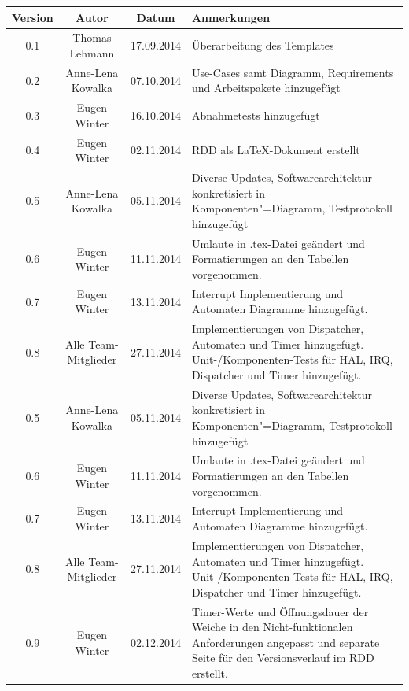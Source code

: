 \documentclass[oneside,a4paper,titlepage]{scrartcl}              %
\begin{document}
\begin{small}
  \begin{center}
    \begin{tabular}{|c|c|c|p{7.25cm}|}
      \hline
      \rowcolor{lightgray}\textbf{Version} & \textbf{Autor} & \textbf{Datum} & \textbf{Anmerkungen}\\
      \hline
      0.1 & Thomas Lehmann & 17.09.2014 & Überarbeitung des Templates\\
      \hline
      0.2 & Anne-Lena Kowalka & 07.10.2014 & Use-Cases samt Diagramm, Requirements und Arbeitspakete hinzugefügt\\
      \hline
      0.3 & Eugen Winter & 16.10.2014 & Abnahmetests hinzugefügt\\
      \hline
      0.4 & Eugen Winter & 02.11.2014 & RDD als \LaTeX -Dokument erstellt\\
      \hline
      0.5 & Anne-Lena Kowalka & 05.11.2014 & Diverse Updates, Softwarearchitektur konkretisiert in Komponenten"=Diagramm, Testprotokoll hinzugefügt \\
      \hline
      0.6 & Eugen Winter & 11.11.2014 & Umlaute in .tex-Datei geändert und Formatierungen an den Tabellen vorgenommen.\\
      \hline
      0.7 & Eugen Winter & 13.11.2014 & Interrupt Implementierung und Automaten Diagramme hinzugefügt.\\
      \hline
      0.8 & Alle Team-Mitglieder & 27.11.2014 & Implementierungen von Dispatcher, Automaten und Timer hinzugefügt. Unit-/Komponenten-Tests für HAL, IRQ, Dispatcher und Timer hinzugefügt.\\
      \hline
      0.5 & Anne-Lena Kowalka & 05.11.2014 & Diverse Updates, Softwarearchitektur konkretisiert in Komponenten"=Diagramm, Testprotokoll hinzugefügt \\
      \hline
      0.6 & Eugen Winter & 11.11.2014 & Umlaute in .tex-Datei geändert und Formatierungen an den Tabellen vorgenommen.\\
      \hline
      0.7 & Eugen Winter & 13.11.2014 & Interrupt Implementierung und Automaten Diagramme hinzugefügt.\\
      \hline
      0.8 & Alle Team-Mitglieder & 27.11.2014 & Implementierungen von Dispatcher, Automaten und Timer hinzugefügt. Unit-/Komponenten-Tests für HAL, IRQ, Dispatcher und Timer hinzugefügt.\\
      \hline
      0.9 & Eugen Winter & 02.12.2014 & Timer-Werte und Öffnungsdauer der Weiche in den Nicht-funktionalen Anforderungen angepasst und separate Seite für den Versionsverlauf im RDD erstellt.\\

\end{tabular}
\end{center}
\end{small}
\end{document}
